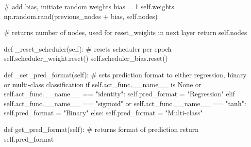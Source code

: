\documentclass[%
oneside,                 %
final,                   %
10pt]{article}
\begin{document}
        # add bias, initiate random weights
        bias = 1
        self.weights = np.random.rand(previous_nodes + bias, self.nodes)

        # returns number of nodes, used for reset_weights in next layer
        return self.nodes

    def _reset_scheduler(self):
        # resets scheduler per epoch
        self.scheduler_weight.reset()
        self.scheduler_bias.reset()

    def _set_pred_format(self):
        # sets prediction format to either regression, binary or multi-class classification
        if self.act_func.__name__ is None or self.act_func.__name__ == "identity":
            self.pred_format = "Regression"
        elif self.act_func.__name__ == "sigmoid" or self.act_func.__name__ == "tanh":
            self.pred_format = "Binary"
        else:
            self.pred_format = "Multi-class"

    def get_pred_format(self):
        # returns format of prediction
        return self.pred_format

\epycod
\end{document}
